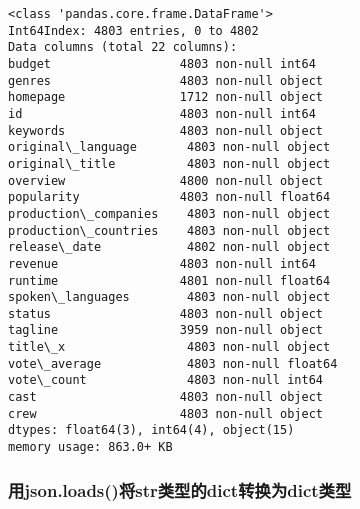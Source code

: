 \documentclass[11pt]{article}
\begin{document}
    \begin{Verbatim}[commandchars=\\\{\}]
<class 'pandas.core.frame.DataFrame'>
Int64Index: 4803 entries, 0 to 4802
Data columns (total 22 columns):
budget                  4803 non-null int64
genres                  4803 non-null object
homepage                1712 non-null object
id                      4803 non-null int64
keywords                4803 non-null object
original\_language       4803 non-null object
original\_title          4803 non-null object
overview                4800 non-null object
popularity              4803 non-null float64
production\_companies    4803 non-null object
production\_countries    4803 non-null object
release\_date            4802 non-null object
revenue                 4803 non-null int64
runtime                 4801 non-null float64
spoken\_languages        4803 non-null object
status                  4803 non-null object
tagline                 3959 non-null object
title\_x                 4803 non-null object
vote\_average            4803 non-null float64
vote\_count              4803 non-null int64
cast                    4803 non-null object
crew                    4803 non-null object
dtypes: float64(3), int64(4), object(15)
memory usage: 863.0+ KB

    \end{Verbatim}

    \subsubsection{用json.loads()将str类型的dict转换为dict类型}\label{ux7528json.loadsux5c06strux7c7bux578bux7684dictux8f6cux6362ux4e3adictux7c7bux578b}
\end{document}
